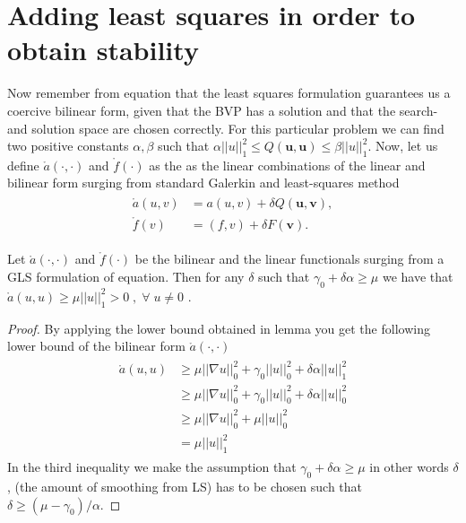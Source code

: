\section{Adding least squares in order to obtain stability}

Now remember from equation that the least squares formulation guarantees us a coercive bilinear form, given that the BVP has a solution and that the search- and solution space are chosen correctly. For this particular problem we can find two positive constants $\alpha,\beta$ such that $\alpha||u||_1^2 \leq Q(\mathbf{u},\mathbf{u}) \leq \beta||u||_1^2 $.
Now, let us define $\mathring{a}(\cdot,\cdot)$ and $\mathring{f}(\cdot)$ as the as the linear combinations of the linear and bilinear form surging from standard Galerkin and least-squares method
\begin{align}
	\begin{split}
	\mathring{a}(u,v) &= a(u,v) + \delta Q(\mathbf{u},\mathbf{\mathbf{v}}), \\
	 \mathring{f}(v) &= (f,v) + \delta F(\mathbf{\mathbf{v}}).
	\end{split}
	\label{eq:GLS}
\end{align}
\begin{lemma}
	Let $\mathring{a}(\cdot,\cdot)$ and $\mathring{f}(\cdot)$ be the bilinear and the linear functionals surging from a GLS formulation of equation. Then for any $\delta$ such that $\gamma_0+\delta \alpha \geq \mu $ we have that $\mathring{a}(u,u) \geq \mu ||u||_1^2>0 \; , \; \forall \; u \neq 0$ .
	\label{lemmaCoercive}
\end{lemma}

\begin{proof}
	
	
By applying the lower bound obtained in lemma  you get the following lower bound of the bilinear form $\mathring{a}(\cdot,\cdot)$
\begin{align}
	\begin{split}
	\mathring{a}(u,u) &\geq \mu ||\nabla u||_0^2+\gamma_0||u||_0^2+\delta \alpha ||u||^2_1 \\
	&\geq \mu ||\nabla u||_0^2+\gamma_0||u||_0^2+\delta \alpha ||u||^2_0 \\
	&\geq \mu ||\nabla u||_0^2+\mu ||u||_0^2 \\
	&= \mu ||u||^2_1
	\end{split}
	\label{eq:coercivity}
\end{align}
In the third inequality we make the assumption that $\gamma_0+\delta \alpha \geq \mu $ in other words $\delta$, (the amount of smoothing from LS) has to be chosen such that $\delta \geq (\mu-\gamma_0)/\alpha$.
\end{proof}

